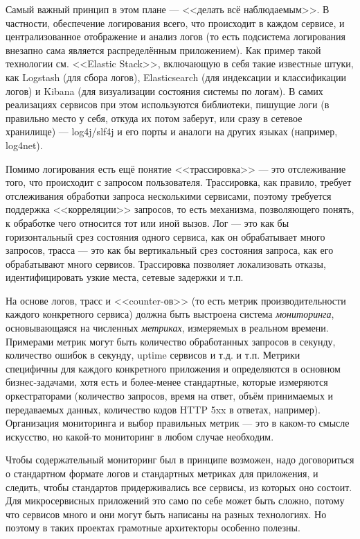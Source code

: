 \documentclass[a5paper]{article}
\begin{document}
Самый важный принцип в этом плане --- <<делать всё наблюдаемым>>. В частности, обеспечение логирования всего, что происходит в каждом сервисе, и централизованное отображение и анализ логов (то есть подсистема логирования внезапно сама является распределённым приложением). Как пример такой технологии см. <<Elastic Stack>>, включающую в себя такие известные штуки, как Logstash (для сбора логов), Elasticsearch (для индексации и классификации логов) и Kibana (для визуализации состояния системы по логам). В самих реализациях сервисов при этом используются библиотеки, пишущие логи (в правильно место у себя, откуда их потом заберут, или сразу в сетевое хранилище) --- log4j/slf4j и его порты и аналоги на других языках (например, log4net).

Помимо логирования есть ещё понятие <<трассировка>> --- это отслеживание того, что происходит с запросом пользователя. Трассировка, как правило, требует отслеживания обработки запроса несколькими сервисами, поэтому требуется поддержка <<корреляции>> запросов, то есть механизма, позволяющего понять, к обработке чего относится тот или иной вызов. Лог --- это как бы горизонтальный срез состояния одного сервиса, как он обрабатывает много запросов, трасса --- это как бы вертикальный срез состояния запроса, как его обрабатывают много сервисов. Трассировка позволяет локализовать отказы, идентифицировать узкие места, сетевые задержки и т.п.

На основе логов, трасс и <<counter-ов>> (то есть метрик производительности каждого конкретного сервиса) должна быть выстроена система \emph{мониторинга}, основывающаяся на численных \emph{метриках}, измеряемых в реальном времени. Примерами метрик могут быть количество обработанных запросов в секунду, количество ошибок в секунду, uptime сервисов и т.д. и т.п. Метрики специфичны для каждого конкретного приложения и определяются в основном бизнес-задачами, хотя есть и более-менее стандартные, которые измеряются оркестраторами (количество запросов, время на ответ, объём принимаемых и передаваемых данных, количество кодов HTTP 5xx в ответах, например). Организация мониторинга и выбор правильных метрик --- это в каком-то смысле искусство, но какой-то мониторинг в любом случае необходим.

Чтобы содержательный мониторинг был в принципе возможен, надо договориться о стандартном формате логов и стандартных метриках для приложения, и следить, чтобы стандартов придерживались все сервисы, из которых оно состоит. Для микросервисных приложений это само по себе может быть сложно, потому что сервисов много и они могут быть написаны на разных технологиях. Но поэтому в таких проектах грамотные архитекторы особенно полезны.
\end{document}
